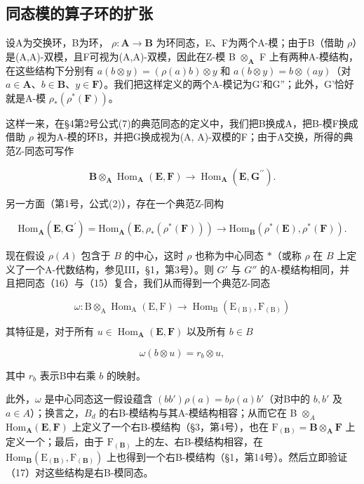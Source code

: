\subsection{同态模的算子环的扩张}

设A为交换环，B为环， \(\rho: \mathbf{A} \to \mathbf{B}\) 为环同态，E、F为两个A-模；由于B（借助 \(\rho\)）是(A,A)-双模，且F可视为(A,A)-双模，因此在Z-模 B \(\otimes_{\mathbf{A}}\) F 上有两种A-模结构，在这些结构下分别有 \(a(b \otimes y) = (\rho(a)b) \otimes y\) 和 \(a(b \otimes y) = b \otimes (ay)\)（对 \(a \in \mathbf{A}\)、\(b \in \mathbf{B}\)、\(y \in \mathbf{F}\)）。我们把这样定义的两个A-模记为G'和G''；此外，G'恰好就是A-模 \(\rho_*(\rho^*(\mathbf{F}))\)。

这样一来，在§4第2号公式(7)的典范同态的定义中，我们把B换成A，把B-模F换成借助 \(\rho\) 视为A-模的环B，并把G换成视为(A, A)-双模的F；由于A交换，所得的典范Z-同态可写作

\[
\mathbf {B} \otimes_ {\mathbf {A}} \operatorname{Hom} _ {\mathbf {A}} (\mathbf {E}, \mathbf {F}) \rightarrow \operatorname{Hom} _ {\mathbf {A}} (\mathbf {E}, \mathbf {G} ^ {\prime \prime}).\tag{15}
\]

另一方面（第1号，公式(2)），存在一个典范Z-同构

\[
\mathrm{Hom} _ {\mathbf {A}} (\mathbf {E}, \mathbf {G} ^ {\prime}) = \mathrm{Hom} _ {\mathbf {A}} (\mathbf {E}, \rho_ {*} (\rho^ {*} (\mathbf {F}))) \rightarrow \mathrm{Hom} _ {\mathbf {B}} (\rho^ {*} (\mathbf {E}), \rho^ {*} (\mathbf {F})). \tag {16}
\]

现在假设 \(\rho(A)\) 包含于 \(B\) 的中心，这时 \(\rho\) 也称为中心同态 \(*\)（或称 \(\rho\) 在 \(B\) 上定义了一个A-代数结构，参见III，§1，第3号）。则 \(G'\) 与 \(G''\) 的A-模结构相同，并且把同态（16）与（15）复合，我们从而得到一个典范Z-同态

\[
\omega : \mathrm{B} \otimes_ {\mathrm{A}} \operatorname{Hom} _ {\mathrm{A}} (\mathrm{E}, \mathrm{F}) \rightarrow \operatorname{Hom} _ {\mathrm{B}} \left(\mathrm{E} _ {(\mathrm{B})}, \mathrm{F} _ {(\mathrm{B})}\right)\tag{17}
\]

其特征是，对于所有 \(u \in \operatorname{Hom}_{\mathbf{A}}(\mathbf{E}, \mathbf{F})\) 以及所有 \(b \in B\)

\[
\omega (b \otimes u) = r _ {b} \otimes u,\tag{18}
\]

其中 \(r_b\) 表示B中右乘 \(b\) 的映射。

此外，\(\omega\) 是中心同态这一假设蕴含 \((bb')\rho(a) = b\rho(a)b'\)（对B中的 \(b, b'\) 及 \(a \in A\)）；换言之，\(B_d\) 的右B-模结构与其A-模结构相容；从而它在 B \(\otimes_A\) \(\mathrm{Hom}_{\mathbf{A}}(\mathbf{E}, \mathbf{F})\) 上定义了一个右B-模结构（§3，第4号），也在 \(\mathrm{F}_{(\mathbf{B})} = \mathbf{B} \otimes_{\mathbf{A}} \mathbf{F}\) 上定义一个；最后，由于 \(\mathrm{F}_{(\mathbf{B})}\) 上的左、右B-模结构相容，在 \(\mathrm{Hom}_{\mathbf{B}}(\mathrm{E}_{(\mathbf{B})}, \mathrm{F}_{(\mathbf{B})})\) 上也得到一个右B-模结构（§1，第14号）。然后立即验证（17）对这些结构是右B-模同态。

